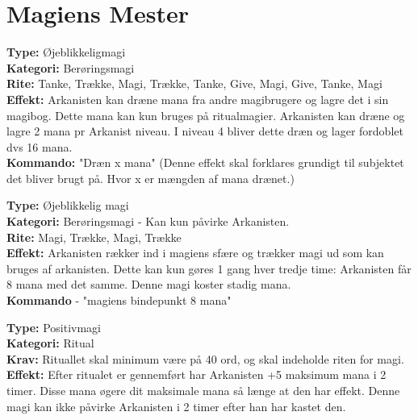 \section{Magiens Mester}

\begin{mesterMagi*}
\textbf{Type:} Øjeblikkeligmagi\\
\textbf{Kategori:} Berøringsmagi\\
\textbf{Rite:} Tanke, Trække, Magi, Trække, Tanke, Give, Magi, Give, Tanke, Magi\\
\textbf{Effekt:} Arkanisten kan dræne mana fra andre magibrugere og lagre det i sin magibog. Dette mana kan kun bruges på ritualmagier. Arkanisten kan dræne og lagre 2 mana pr Arkanist niveau. I niveau 4 bliver dette dræn og lager fordoblet dvs 16 mana.\\
\textbf{Kommando:} "Dræn x mana" (Denne effekt skal forklares grundigt til subjektet det bliver brugt på. Hvor x er mængden af mana drænet.)
\end{mesterMagi*}

\begin{mesterMagi*}
\textbf{Type:} Øjeblikkelig magi\\
\textbf{Kategori:} Berøringsmagi - Kan kun påvirke Arkanisten.\\
\textbf{Rite:} Magi, Trække, Magi, Trække\\
\textbf{Effekt:} Arkanisten rækker ind i magiens sfære og trækker magi ud som kan bruges af arkanisten. Dette kan kun gøres 1 gang hver tredje time: Arkanisten får 8 mana med det samme. Denne magi koster stadig mana.\\
\textbf{Kommando} - "magiens bindepunkt 8 mana"
\end{mesterMagi*}

\begin{mesterMagi*}[Energilager]
\textbf{Type:} Positivmagi\\
\textbf{Kategori:} Ritual\\
\textbf{Krav:} Rituallet skal minimum være på 40 ord, og skal indeholde riten for magi.\\
\textbf{Effekt:}  Efter ritualet er gennemført har Arkanisten +5 maksimum mana i 2 timer. Disse mana øgere dit maksimale mana så længe at den har effekt. Denne magi kan ikke påvirke Arkanisten i 2 timer efter han har kastet den.
\end{mesterMagi*}

